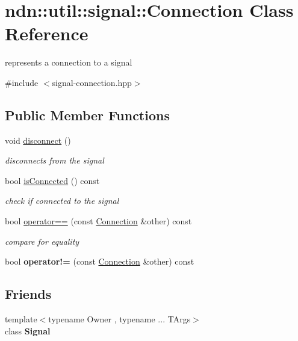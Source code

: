 \hypertarget{classndn_1_1util_1_1signal_1_1Connection}{}\section{ndn\+:\+:util\+:\+:signal\+:\+:Connection Class Reference}
\label{classndn_1_1util_1_1signal_1_1Connection}


represents a connection to a signal  




{\ttfamily \#include $<$signal-\/connection.\+hpp$>$}

\subsection*{Public Member Functions}
\begin{DoxyCompactItemize}
\item 
void \hyperlink{classndn_1_1util_1_1signal_1_1Connection_abcebeaa090880c3b5d3ae485fef6ca04}{disconnect} ()
\begin{DoxyCompactList}\small\item\em disconnects from the signal \end{DoxyCompactList}\item 
bool \hyperlink{classndn_1_1util_1_1signal_1_1Connection_a0c1ab2237b16b80f26d66f1215e0e71f}{is\+Connected} () const
\begin{DoxyCompactList}\small\item\em check if connected to the signal \end{DoxyCompactList}\item 
bool \hyperlink{classndn_1_1util_1_1signal_1_1Connection_a6405a5322e3a92a03baa3070e7ee3895}{operator==} (const \hyperlink{classndn_1_1util_1_1signal_1_1Connection}{Connection} \&other) const
\begin{DoxyCompactList}\small\item\em compare for equality \end{DoxyCompactList}\item 
bool {\bfseries operator!=} (const \hyperlink{classndn_1_1util_1_1signal_1_1Connection}{Connection} \&other) const\hypertarget{classndn_1_1util_1_1signal_1_1Connection_a78fa872043f44910c744d1b993a3e866}{}\label{classndn_1_1util_1_1signal_1_1Connection_a78fa872043f44910c744d1b993a3e866}

\end{DoxyCompactItemize}
\subsection*{Friends}
\begin{DoxyCompactItemize}
\item 
{\footnotesize template$<$typename Owner , typename ... T\+Args$>$ }\\class {\bfseries Signal}\hypertarget{classndn_1_1util_1_1signal_1_1Connection_a7cea54a98a220ab4ff4f533b911a3e5b}{}\label{classndn_1_1util_1_1signal_1_1Connection_a7cea54a98a220ab4ff4f533b911a3e5b}

\end{DoxyCompactItemize}



